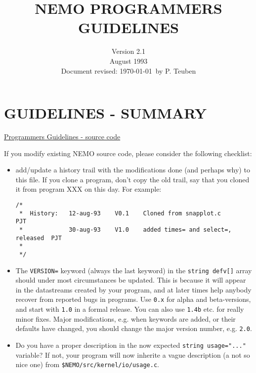 

\title{NEMO PROGRAMMERS GUIDELINES}

\date{Version 2.1 \\
 August 1993 \\
 Document revised: \today\ by P. Teuben}


\setlength{\parindent}{0pt}
\setlength{\parskip}{2.5mm}

\section*{GUIDELINES - SUMMARY}

\centerline{\underline{Programmers Guidelines - source code}}

If you modify existing NEMO source code, please consider the
following checklist:

\begin{itemize}
\item 

add/update a history trail with the modifications done (and perhaps
why) to this file. If you clone a program, don't copy the old trail,
say that you cloned it from program XXX on this day. For example:

\footnotesize\begin{verbatim}
/*
 *  History:   12-aug-93    V0.1    Cloned from snapplot.c              PJT
 *             30-aug-93    V1.0    added times= and select=, released  PJT
 *
 */
\end{verbatim}\normalsize

\item 
    
The {\tt VERSION=} keyword (always the last keyword) in the
{\tt string defv[]} array should under most circumstances be updated.
This is because it will appear in the datastreams created by  your program,
and at later times help anybody recover from reported bugs in programs.
Use {\tt 0.x} for alpha and beta-versions, and start with {\tt 1.0}
in a formal release. You can also use {\tt 1.4b} etc. for really
minor fixes. Major modifications, e.g. when keywords are added,
or their defaults have changed, you should change the major version
number, e.g. {\tt 2.0}.

\item  

Do you have a proper description in the now expected
{\tt string usage="..."} variable? If not, your program will now
inherite a vague description (a not so nice one)
from {\tt \$NEMO/src/kernel/io/usage.c}.

\end{itemize}

